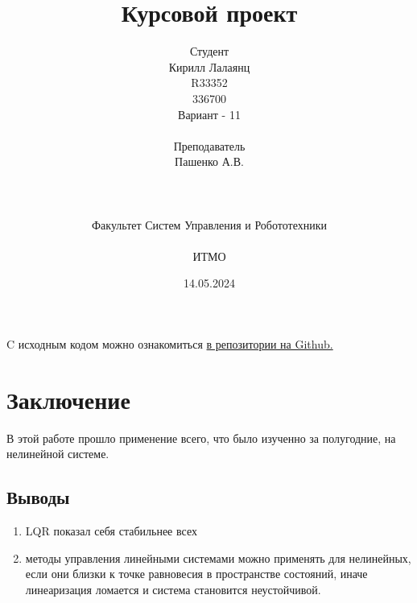\documentclass[16pt]{article}
\title{Курсовой проект}
\author{
Студент \\
Кирилл Лалаянц\\
R33352\\
336700\\
Вариант - 11\\
\\
Преподаватель\\
Пашенко А.В. \\
\\
\\
\\
Факультет Систем Управления и Робототехники\\
\\
ИТМО\\
}
\date{14.05.2024}
\begin{document}
\maketitle
\newpage
\tableofcontents
\thispagestyle{empty}

\newpage
\setcounter{page}{1}
C исходным кодом можно ознакомиться \href{https://github.com/lalayants/control-theory-itmo-2023-2024}{в репозитории на Github.}


\newpage

\FloatBarrier

\newpage

\FloatBarrier

\newpage

\FloatBarrier

\newpage

\FloatBarrier

\newpage

\FloatBarrier

\newpage

\FloatBarrier

\newpage
\newpage
\section{Заключение}
В этой работе прошло применение всего, что было изученно за полугодние, на нелинейной системе.
\subsection{Выводы}
\begin{enumerate}
   \item LQR показал себя стабильнее всех 
   \item методы управления линейными системами можно применять для нелинейных, если они близки к точке равновесия в пространстве состояний, иначе линеаризация ломается и система становится неустойчивой.
\end{enumerate}
\end{document}
